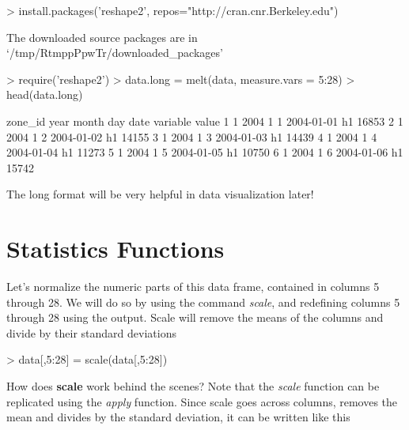 \documentclass{article}
\begin{document}
\begin{Schunk}
\begin{Sinput}
> install.packages('reshape2', repos="http://cran.cnr.Berkeley.edu")
\end{Sinput}
\begin{Soutput}
The downloaded source packages are in
	‘/tmp/RtmppPpwTr/downloaded_packages’
\end{Soutput}
\begin{Sinput}
> require('reshape2')
> data.long = melt(data, measure.vars = 5:28)
> head(data.long)
\end{Sinput}
\begin{Soutput}
  zone_id year month day       date variable value
1       1 2004     1   1 2004-01-01       h1 16853
2       1 2004     1   2 2004-01-02       h1 14155
3       1 2004     1   3 2004-01-03       h1 14439
4       1 2004     1   4 2004-01-04       h1 11273
5       1 2004     1   5 2004-01-05       h1 10750
6       1 2004     1   6 2004-01-06       h1 15742
\end{Soutput}
\end{Schunk}

The long format will be very helpful in data visualization later!

\section{Statistics Functions}

Let's normalize the numeric parts of this data frame, contained in columns 5
through 28.  We will do so by using the command \textit{scale}, and redefining
columns 5 through 28 using the output.  Scale will remove the means of the
columns and divide by their standard deviations

\begin{Schunk}
\begin{Sinput}
> data[,5:28] = scale(data[,5:28])
\end{Sinput}
\end{Schunk}

How does \textbf{scale} work behind the scenes?  Note that the \textit{scale}
function can be replicated using the \textit{apply}  function.  Since scale
goes across columns, removes the mean and divides by the standard deviation,
it can be written like this
\end{document}
